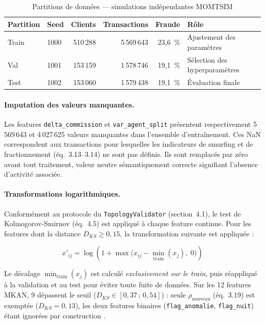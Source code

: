 \documentclass[11pt,a4paper,oneside]{report}
\theoremstyle{definition}
\theoremstyle{remark}
\begin{document}
\begin{table}[h!]
\centering
\caption{Partitions de données --- simulations indépendantes MOMTSIM}
\label{tab:splits}
\begin{tabular}{llrrrl}
\hline
\textbf{Partition} & \textbf{Seed} & \textbf{Clients} & \textbf{Transactions} & \textbf{Fraude} & \textbf{Rôle} \\
\hline
Train & 1000 & 510\,288 & 5\,569\,643 & 23{,}6~\% & Ajustement des paramètres \\
Val   & 1001 & 153\,159 & 1\,578\,746 & 19{,}1~\% & Sélection des hyperparamètres \\
Test  & 1002 & 153\,060 & 1\,579\,438 & 19{,}1~\% & Évaluation finale \\
\hline
\end{tabular}
\end{table}

\paragraph{Imputation des valeurs manquantes.}
Les features \texttt{delta\_commission} et \texttt{var\_agent\_split} présentent respectivement 5\,569\,643 et 4\,027\,625 valeurs manquantes dans l'ensemble d'entraînement. Ces NaN correspondent aux transactions pour lesquelles les indicateurs de smurfing et de fractionnement (éq.~3.13--3.14) ne sont pas définis. Ils sont remplacés par zéro avant tout traitement, valeur neutre sémantiquement correcte signifiant l'absence d'activité associée.

\paragraph{Transformations logarithmiques.}
Conformément au protocole du \texttt{TopologyValidator} (section~4.1), le test de Kolmogorov-Smirnov (éq.~4.5) est appliqué à chaque feature continue. Pour les features dont la distance $D_{KS} \geq 0{,}15$, la transformation suivante est appliquée :

\begin{equation}
    x'_{ij} = \log\!\left(1 + \max\!\bigl(x_{ij} - \min_{\mathrm{train}}(x_j),\; 0\bigr)\right)
    \label{eq:logtransform}
\end{equation}

Le décalage $\min_{\mathrm{train}}(x_j)$ est calculé \textit{exclusivement sur le train}, puis réappliqué à la validation et au test pour éviter toute fuite de données. Sur les 12 features MKAN, 9 dépassent le seuil ($D_{KS} \in [0{,}37\,;\,0{,}54]$) : seule $\rho_{\text{nouveau}}$ (éq.~3.19) est exemptée ($D_{KS} = 0{,}13$), les deux features binaires (\texttt{flag\_anomalie}, \texttt{flag\_nuit}) étant ignorées par construction \citep{hou2024critical}.
\end{document}

